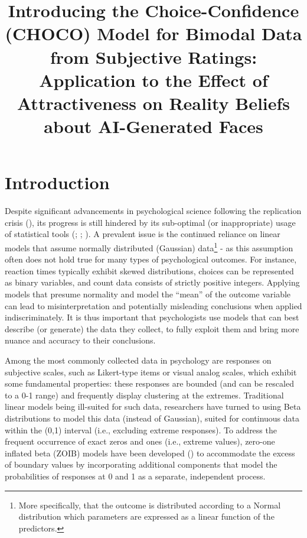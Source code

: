 \documentclass[
  jou,
  floatsintext,
  longtable,
  nolmodern,
  notxfonts,
  notimes,
  colorlinks=true,linkcolor=blue,citecolor=blue,urlcolor=blue]{apa7}
\title{\textbf{Introducing the Choice-Confidence (CHOCO) Model for
Bimodal Data from Subjective Ratings: Application to the Effect of
Attractiveness on Reality Beliefs about AI-Generated Faces}}
\begin{document}
\maketitle


\setcounter{secnumdepth}{-\maxdimen} %

\setlength\LTleft{0pt}

\resetlinenumber[1]

\section{Introduction}\label{introduction}

Despite significant advancements in psychological science following the
replication crisis (), its progress is still hindered by its sub-optimal (or
inappropriate) usage of statistical tools
(;
;
). A prevalent
issue is the continued reliance on linear models that assume normally
distributed (Gaussian) data\footnote{More specifically, that the outcome
  is distributed according to a Normal distribution which parameters are
  expressed as a linear function of the predictors.} - as this
assumption often does not hold true for many types of psychological
outcomes. For instance, reaction times typically exhibit skewed
distributions, choices can be represented as binary variables, and count
data consists of strictly positive integers. Applying models that
presume normality and model the ``mean'' of the outcome variable can
lead to misinterpretation and potentially misleading conclusions when
applied indiscriminately. It is thus important that psychologists use
models that can best describe (or generate) the data they collect, to
fully exploit them and bring more nuance and accuracy to their
conclusions.

Among the most commonly collected data in psychology are responses on
subjective scales, such as Likert-type items or visual analog scales,
which exhibit some fundamental properties: these responses are bounded
(and can be rescaled to a 0-1 range) and frequently display clustering
at the extremes. Traditional linear models being ill-suited for such
data, researchers have turned to using Beta distributions to model this
data (instead of Gaussian), suited for continuous data within the (0,1)
interval (i.e., excluding extreme responses). To address the frequent
occurrence of exact zeros and ones (i.e., extreme values), zero-one
inflated beta (ZOIB) models have been developed
() to
accommodate the excess of boundary values by incorporating additional
components that model the probabilities of responses at 0 and 1 as a
separate, independent process.
\end{document}
